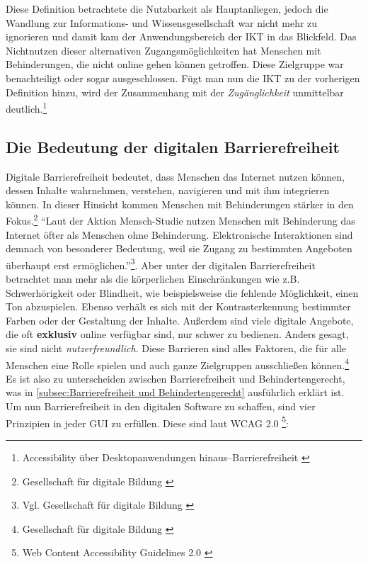 Diese Definition betrachtete die Nutzbarkeit als Hauptanliegen, jedoch die Wandlung zur Informations- und Wissensgesellschaft war nicht mehr zu ignorieren und damit kam der Anwendungsbereich der \ac{IKT} in das Blickfeld. Das Nichtnutzen dieser alternativen Zugangsmöglichkeiten hat Menschen mit Behinderungen, die nicht online gehen können getroffen. Diese Zielgruppe war benachteiligt oder sogar ausgeschlossen. Fügt man nun die \ac{IKT} zu der vorherigen Definition hinzu, wird der Zusammenhang mit der \textit{Zugänglichkeit} unmittelbar deutlich.\footnote{Accessibility über Desktopanwendungen hinaus–Barrierefreiheit \cite{buhler2017accessibility}}

\subsection{Die Bedeutung der digitalen Barrierefreiheit}
\label{subsec: Die Bedeutung der digitalen Barrierefreiheit}

Digitale Barrierefreiheit bedeutet, dass Menschen das Internet nutzen können, dessen Inhalte wahrnehmen, verstehen, navigieren und mit ihm integrieren können. In dieser Hinsicht kommen Menschen mit Behinderungen stärker in den Fokus.\footnote{Gesellschaft für digitale Bildung \cite{GFDB}} "`Laut der Aktion Mensch-Studie nutzen Menschen mit Behinderung das Internet öfter als Menschen ohne Behinderung. Elektronische Interaktionen sind demnach von besonderer Bedeutung, weil sie Zugang zu bestimmten Angeboten überhaupt erst ermöglichen."'\footnote{Vgl. Gesellschaft für digitale Bildung \cite{GFDB}}. Aber unter der digitalen Barrierefreiheit betrachtet man mehr als die körperlichen Einschränkungen wie z.B. Schwerhörigkeit oder Blindheit, wie beispielsweise die fehlende Möglichkeit, einen Ton abzuspielen. Ebenso verhält es sich mit der Kontrasterkennung bestimmter Farben oder der Gestaltung der Inhalte. Außerdem sind viele digitale Angebote, die oft \textbf{exklusiv} online verfügbar sind, nur schwer zu bedienen. Anders gesagt, sie sind nicht \textit{nutzerfreundlich}. Diese Barrieren sind alles Faktoren, die für alle Menschen eine Rolle spielen und auch ganze Zielgruppen ausschließen können.\footnote{Gesellschaft für digitale Bildung \cite{GFDB}} Es ist also zu unterscheiden zwischen Barrierefreiheit und Behindertengerecht, was in \cref{subsec:Barrierefreiheit und Behindertengerecht} ausführlich erklärt ist. Um nun Barrierefreiheit in den digitalen Software zu schaffen, sind vier Prinzipien in jeder \ac{GUI} zu erfüllen. Diese sind laut \ac{WCAG} 2.0 \footnote{Web Content Accessibility Guidelines 2.0 \cite{caldwell2008web}}:

